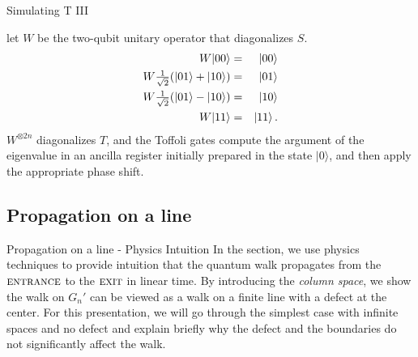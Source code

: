 \documentclass{beamer}
\newcommand{\<}{\langle}
\renewcommand{\>}{\rangle}
\newcommand{\bea}{\begin{eqnarray}}
\newcommand{\eea}{\end{eqnarray}}
\newcommand{\ent}{{\textsc{entrance}}}
\newcommand{\exit}{{\textsc{exit}}}
\begin{document}
\begin{frame}{Simulating T III}

let $W$ be the two-qubit unitary operator that diagonalizes $S$.
\bea
  W |00\> &=& |00\> \\
  W {\textstyle{1 \over \sqrt2}}(|01\> + |10\>) &=& |01\> \\
  W {\textstyle{1 \over \sqrt2}}(|01\> - |10\>) &=& |10\> \\
  W |11\> &=& |11\>
\,.
\eea
$W^{\otimes 2n}$ diagonalizes $T$, and the Toffoli gates compute
the argument of the eigenvalue in an ancilla register initially prepared
in the state $|0\>$, and then apply the appropriate phase shift.

\end{frame}



\subsection{Propagation on a line}\label{subsec:line}

\begin{frame}{Propagation on a line - Physics Intuition}
In the section, we use physics techniques to provide intuition that the quantum walk propagates from the $\ent$ to the $\exit$ in linear time. 
\newline 
\newline 
By introducing the {\em column space}, we show the walk on $G_n'$ can be viewed as a walk on a finite line with a defect at the center.
\newline
\newline 
For this presentation, we will go through the simplest case with infinite spaces and no defect and explain briefly why the defect and the boundaries do not significantly affect the walk.

\end{frame}
\end{document}
